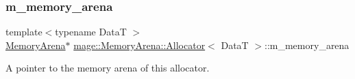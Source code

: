 \subsubsection{\texorpdfstring{m\+\_\+memory\+\_\+arena}{m\_memory\_arena}}
{\footnotesize\ttfamily template$<$typename DataT $>$ \\
\hyperlink{classmage_1_1_memory_arena}{Memory\+Arena}$\ast$ \hyperlink{classmage_1_1_memory_arena_1_1_allocator}{mage\+::\+Memory\+Arena\+::\+Allocator}$<$ DataT $>$\+::m\+\_\+memory\+\_\+arena\hspace{0.3cm}{\ttfamily [private]}}

A pointer to the memory arena of this allocator. 